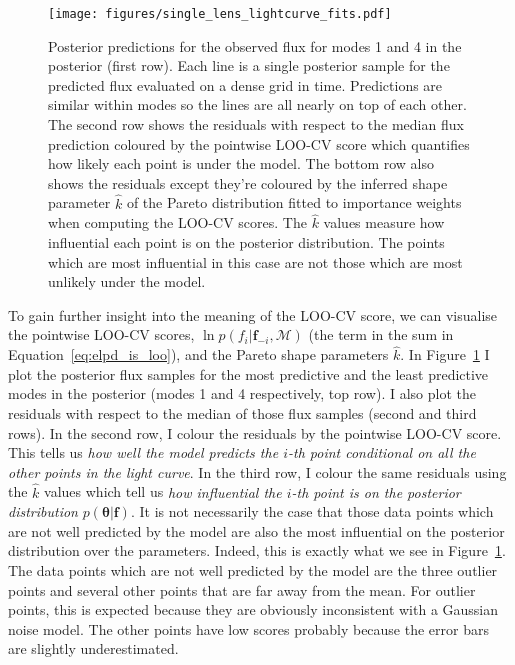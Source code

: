 \documentclass[12pt,dvipsnames]{report}
\renewcommand{\vec}[1]{\boldsymbol{\mathbf{#1}}}
\begin{document}
\begin{figure}[t]
    \begin{centering}
        \texttt{[image: figures/single\_lens\_lightcurve\_fits.pdf]}
        \caption{Posterior predictions for the observed flux for modes 1 and 4 in
        the posterior (first row).
        Each line is a single posterior sample for the predicted flux evaluated
        on a dense grid in time. Predictions are similar within modes so the lines 
        are all nearly on top of each other. The second row shows the residuals with 
        respect to the median flux prediction coloured by the pointwise LOO-CV score
        which quantifies how likely each point is under the model.
        The bottom row also shows the residuals except they're coloured by the inferred 
        shape parameter $\hat k$ of the Pareto distribution fitted to importance weights 
        when computing the LOO-CV scores. The $\hat k$ values measure how influential 
        each point is on the posterior distribution. The points which are most 
        influential in this case are not those which are most unlikely under the model.}
            \label{fig:ogle_lightcurve_fits}
    \end{centering}
\end{figure}

To gain further insight into the meaning of the LOO-CV score, we can visualise the 
pointwise LOO-CV scores, $\ln p\left(f_{i} \lvert \vec f_{-i},\mathcal{M}\right)$ 
(the term in the sum in Equation~\ref{eq:elpd_is_loo}), and the Pareto shape parameters
$\hat k$.
In Figure~\ref{fig:ogle_lightcurve_fits} I plot the posterior flux samples for the most 
predictive and the least predictive modes in the posterior (modes 1 and 4 respectively,
top row). I also plot the residuals with respect to the median of those 
flux samples (second and third rows). In the second row, I colour the residuals by the 
pointwise LOO-CV score. 
This tells us \emph{how well the model predicts the $i$-th point conditional on all the other 
points in the light curve}. In the third row, I colour the same residuals using the
$\hat k$ values which tell us \emph{how influential the $i$-th point is on 
the posterior distribution} $p(\vec\theta|\vec f)$. It is not necessarily the case that those 
data points which are not well predicted by the model are also the most influential on the posterior distribution over the 
parameters. Indeed, this is exactly what we see in 
Figure~\ref{fig:ogle_lightcurve_fits}. The data points which 
are not well predicted by the model are the three outlier points and several other points 
that are far away from the mean. For outlier points, this is expected
because they are obviously inconsistent with a Gaussian noise model. The other points 
have low scores probably because the error bars are slightly underestimated. 
\end{document}
